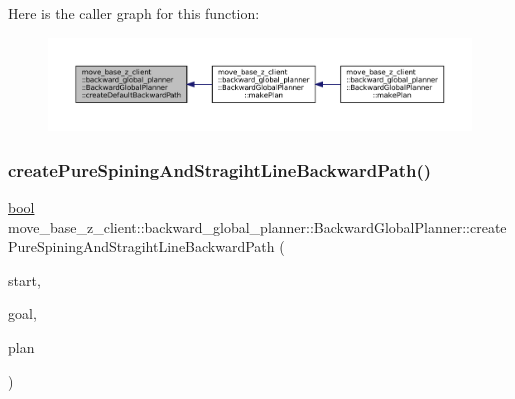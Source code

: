 Here is the caller graph for this function\+:
\nopagebreak
\begin{figure}[H]
\begin{center}
\leavevmode
\includegraphics[width=350pt]{classmove__base__z__client_1_1backward__global__planner_1_1BackwardGlobalPlanner_a395d7f10f5e8dfb26fe9809912f29795_icgraph}
\end{center}
\end{figure}
\mbox{\label{classmove__base__z__client_1_1backward__global__planner_1_1BackwardGlobalPlanner_af933b5deeaf3d0022fd93164a34b6068}} 
\subsubsection{\texorpdfstring{create\+Pure\+Spining\+And\+Stragiht\+Line\+Backward\+Path()}{createPureSpiningAndStragihtLineBackwardPath()}}
{\footnotesize\ttfamily \hyperlink{classbool}{bool} move\+\_\+base\+\_\+z\+\_\+client\+::backward\+\_\+global\+\_\+planner\+::\+Backward\+Global\+Planner\+::create\+Pure\+Spining\+And\+Stragiht\+Line\+Backward\+Path (\begin{DoxyParamCaption}\item[{const geometry\+\_\+msgs\+::\+Pose\+Stamped \&}]{start,  }\item[{const geometry\+\_\+msgs\+::\+Pose\+Stamped \&}]{goal,  }\item[{std\+::vector$<$ geometry\+\_\+msgs\+::\+Pose\+Stamped $>$ \&}]{plan }\end{DoxyParamCaption})\hspace{0.3cm}{\ttfamily [virtual]}}

